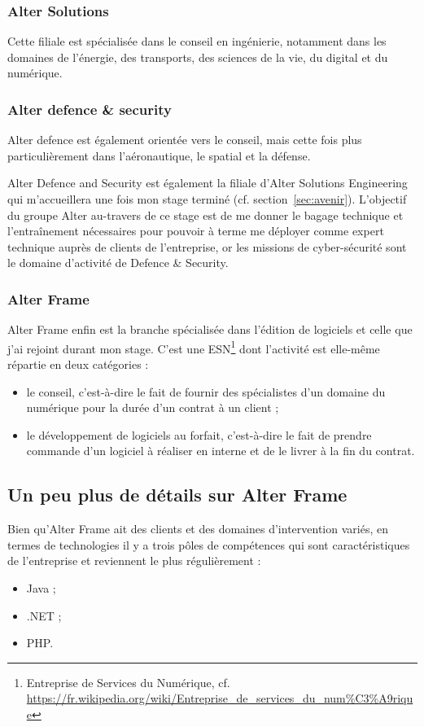 \subsubsection{Alter Solutions}
Cette filiale est spécialisée dans le conseil en ingénierie, notamment dans les domaines de l'énergie, des transports, des sciences de la vie, du digital et du numérique.

\subsubsection{Alter defence \& security}
Alter defence est également orientée vers le conseil, mais cette fois plus particulièrement dans l'aéronautique, le spatial et la défense.

Alter Defence and Security est également la filiale d'Alter Solutions Engineering qui m'accueillera une fois mon stage terminé (cf. section~\ref{sec:avenir}). L'objectif du groupe Alter au-travers de ce stage est de me donner le bagage technique et l'entraînement nécessaires pour pouvoir à terme me déployer comme expert technique auprès de clients de l'entreprise, or les missions de cyber-sécurité sont le domaine d'activité de Defence \& Security.

\subsubsection{Alter Frame}
Alter Frame enfin est la branche spécialisée dans l'édition de logiciels et celle que j'ai rejoint durant mon stage. C'est une ESN\footnote{Entreprise de Services du Numérique, cf. \url{https://fr.wikipedia.org/wiki/Entreprise_de_services_du_num\%C3\%A9rique}} dont l'activité est elle-même répartie en deux catégories :
\begin{itemize}[label=$\bullet$]
\item le conseil, c'est-à-dire le fait de fournir des spécialistes d'un domaine du numérique pour la durée d'un contrat à un client ;
\item le développement de logiciels au forfait, c'est-à-dire le fait de prendre commande d'un logiciel à réaliser en interne et de le livrer à la fin du contrat.
\end{itemize}

\subsection{Un peu plus de détails sur Alter Frame}
\label{subsec:frame}
Bien qu'Alter Frame ait des clients et des domaines d'intervention variés, en termes de technologies il y a trois pôles de compétences qui sont caractéristiques de l'entreprise et reviennent le plus régulièrement :
\begin{itemize}[label=$\bullet$]
\item Java ;
\item .NET ;
\item PHP.
\end{itemize}

